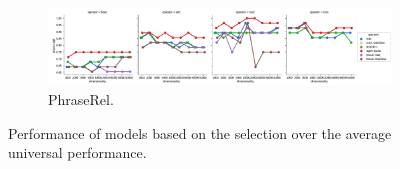 \begin{figure}
  \begin{subfigure}[t]{\textwidth}
    \includegraphics[width=\textwidth]{supplement/figures/universal-results-phraserel}
    \caption{PhraseRel.}
    \label{fig:universal-results-phraserel}
  \end{subfigure}


  \caption{Performance of models based on the selection over the average universal performance.}
  \label{fig:universal-results}
\end{figure}

